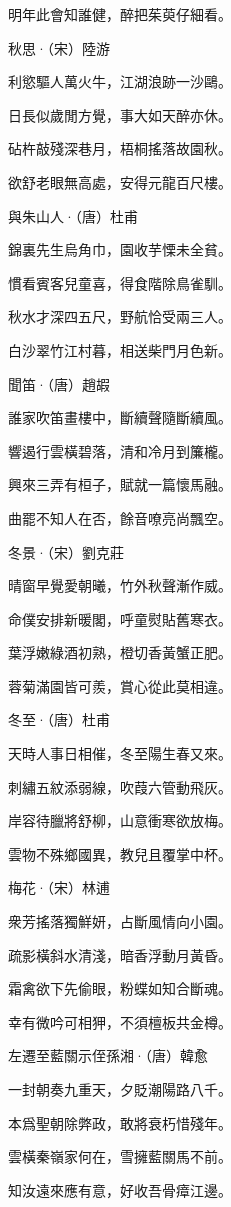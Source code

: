\documentclass[12pt,a4paper]{ctexbook}
\begin{document}
明年此會知誰健，醉把茱萸仔細看。\par
秋思·（宋）陸游\par
利慾驅人萬火牛，江湖浪跡一沙鷗。\par
日長似歲閒方覺，事大如天醉亦休。\par
砧杵敲殘深巷月，梧桐搖落故園秋。\par
欲舒老眼無高處，安得元龍百尺樓。\par
與朱山人·（唐）杜甫\par
錦裏先生烏角巾，園收芋慄未全貧。\par
慣看賓客兒童喜，得食階除鳥雀馴。\par
秋水才深四五尺，野航恰受兩三人。\par
白沙翠竹江村暮，相送柴門月色新。\par
聞笛·（唐）趙嘏\par
誰家吹笛畫樓中，斷續聲隨斷續風。\par
響遏行雲橫碧落，清和冷月到簾櫳。\par
興來三弄有桓子，賦就一篇懷馬融。\par
曲罷不知人在否，餘音嘹亮尚飄空。\par
冬景·（宋）劉克莊\par
晴窗早覺愛朝曦，竹外秋聲漸作威。\par
命僕安排新暖閣，呼童熨貼舊寒衣。\par
葉浮嫩綠酒初熟，橙切香黃蟹正肥。\par
蓉菊滿園皆可羨，賞心從此莫相違。\par
冬至·（唐）杜甫\par
天時人事日相催，冬至陽生春又來。\par
刺繡五紋添弱線，吹葭六管動飛灰。\par
岸容待臘將舒柳，山意衝寒欲放梅。\par
雲物不殊鄉國異，教兒且覆掌中杯。\par
梅花·（宋）林逋\par
衆芳搖落獨鮮妍，占斷風情向小園。\par
疏影橫斜水清淺，暗香浮動月黃昏。\par
霜禽欲下先偷眼，粉蝶如知合斷魂。\par
幸有微吟可相狎，不須檀板共金樽。\par
左遷至藍關示侄孫湘·（唐）韓愈\par
一封朝奏九重天，夕貶潮陽路八千。\par
本爲聖朝除弊政，敢將衰朽惜殘年。\par
雲橫秦嶺家何在，雪擁藍關馬不前。\par
知汝遠來應有意，好收吾骨瘴江邊。\par
\end{document}
